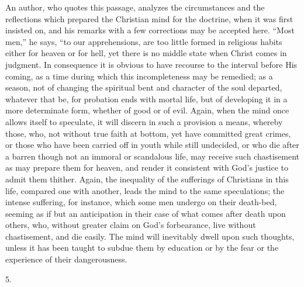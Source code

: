 An author, who quotes this passage, analyzes the circumstances and
the reflections which prepared the Christian mind for the doctrine,
when it was first insisted on, and his remarks with a few corrections
may be accepted here. ``Most men,'' he says, ``to our
apprehensions, are too little formed in religious habits either for
heaven or for hell, yet there is no middle state when Christ comes in
judgment. In consequence it is obvious to have recourse to the
interval before His coming, as a time during which this incompleteness
may be remedied; as a season, not of changing the spiritual bent and
character of the soul departed, whatever that be, for probation ends
with mortal life, but of developing it in a more determinate form,
whether of good or of evil. Again, when the mind once allows itself to
speculate, it will discern in such a provision a means, whereby those,
who, not without true faith at bottom, yet have committed great
crimes, or those who have been carried off in youth while still
undecided, or who die after a barren though not an immoral or
scandalous life, may receive such chastisement as may prepare them for
heaven, and render it consistent with God's justice to admit them
thither. Again, the inequality of the sufferings of Christians in this
life, compared one with another, leads the mind to the same
speculations; the intense suffering, for instance, which some men
undergo on their death-bed, seeming as if but an anticipation in their
case of what comes after death upon others, who, without greater claim
on God's forbearance, live without chastisement, and die easily. The
mind will inevitably dwell upon such thoughts, unless it has been
taught to subdue them by education or by the fear or the experience of
their dangerousness.

5.

